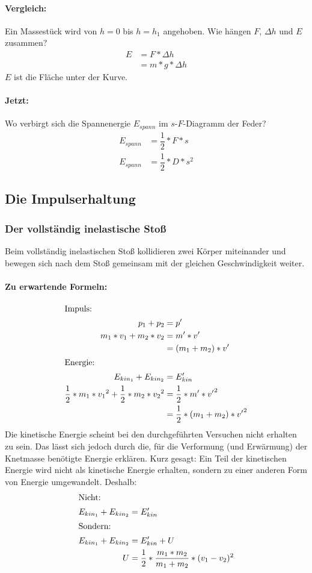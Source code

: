\documentclass[12pt]{article}
\numberwithin{equation}{subsection}
\begin{document}
	\paragraph{Vergleich:}
	Ein Massestück wird von $ h=0 $ bis $ h=h_1 $ angehoben. Wie hängen $ F $, $ \Delta h $ und $ E $ zusammen?
	\begin{align}
		E &= F*\Delta h\\
		&= m*g*\Delta h
	\end{align}
	$ E $ ist die Fläche unter der Kurve.
	\paragraph{Jetzt:}
	Wo verbirgt sich die Spannenergie $ E_{spann} $ im $ s $-$ F $-Diagramm der Feder?
	\begin{align}
		E_{spann} &= \dfrac{1}{2}*F*s\\
		E_{spann} &= \dfrac{1}{2}*D*s^2
	\end{align}
	
	\subsection{Die Impulserhaltung}
	\subsubsection{Der vollständig inelastische Stoß}
	Beim vollständig inelastischen Stoß kollidieren zwei Körper miteinander und bewegen sich nach dem Stoß gemeinsam mit der gleichen Geschwindigkeit weiter.
	\paragraph{Zu erwartende Formeln:}
	\begin{align}
		\shortintertext{Impuls:}
		p_1 + p_2 &= p'\\
		m_1*v_1+m_2*v_2 &= m'*v'\\
		&= (m_1+m_2)*v'\\
		\shortintertext{Energie:}
		E_{kin_{1}}+E_{kin_{2}} &= E'_{kin}\\
		\dfrac{1}{2}*m_1*{v_1}^2+\dfrac{1}{2}*m_2*{v_2}^2 &= \dfrac{1}{2}*m'*{v'}^2\\
		&= \dfrac{1}{2}*(m_1+m_2)*{v'}^2
	\end{align}
	Die kinetische Energie scheint bei den durchgeführten Versuchen nicht erhalten zu sein. Das lässt sich jedoch durch die, für die Verformung (und Erwärmung) der Knetmasse benötigte Energie erklären. Kurz gesagt: Ein Teil der kinetischen Energie wird nicht als kinetische Energie erhalten, sondern zu einer anderen Form von Energie umgewandelt. Deshalb:
	\begin{align}
		\intertext{Nicht:}
		E_{kin_{1}}+E_{kin_{2}} &= E'_{kin}\\
		\intertext{Sondern:}
		E_{kin_{1}}+E_{kin_{2}} &= E'_{kin}+U\\
		U &= \dfrac{1}{2}*\dfrac{m_1*m_2}{m_1+m_2}*(v_1-v_2)^2
	\end{align}
\end{document}
